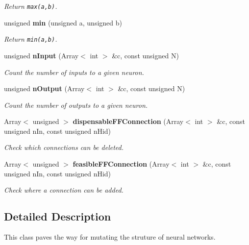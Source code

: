 \begin{CompactItemize}
\begin{CompactList}\small\item\em Return {\tt max(a,b)}.\item\end{CompactList}\item 
{}
unsigned {\bf min} (unsigned a, unsigned b)\label{classFFManip_b7}

\begin{CompactList}\small\item\em Return {\tt min(a,b)}.\item\end{CompactList}\item 
unsigned {\bf n\-Input} (Array$<$ int $>$ \&c, const unsigned N)
\begin{CompactList}\small\item\em Count the number of inputs to a given neuron.\item\end{CompactList}\item 
unsigned {\bf n\-Output} (Array$<$ int $>$ \&c, const unsigned N)
\begin{CompactList}\small\item\em Count the number of outputs to a given neuron.\item\end{CompactList}\item 
Array$<$ unsigned $>$ {\bf dispensable\-FFConnection} (Array$<$ int $>$ \&c, const unsigned n\-In, const unsigned n\-Hid)
\begin{CompactList}\small\item\em Check which connections can be deleted.\item\end{CompactList}\item 
Array$<$ unsigned $>$ {\bf feasible\-FFConnection} (Array$<$ int $>$ \&c, const unsigned n\-In, const unsigned n\-Hid)
\begin{CompactList}\small\item\em Check where a connection can be added.\item\end{CompactList}\end{CompactItemize}


\subsection{Detailed Description}
This class paves the way for mutating the struture of neural networks.

